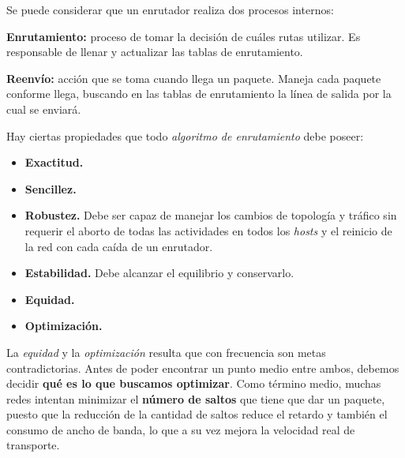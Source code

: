 \documentclass[10pt,a4paper]{article}
\begin{document}
Se puede considerar que un enrutador realiza dos procesos internos:
\begin{description}
\item \textbf{Enrutamiento:} proceso de tomar la decisión de cuáles rutas utilizar. Es responsable de llenar y actualizar las tablas de enrutamiento. 
\item \textbf{Reenvío:} acción que se toma cuando llega un paquete. Maneja cada paquete conforme llega, buscando en las tablas de enrutamiento la línea de salida por la cual se enviará.
\end{description}

Hay ciertas propiedades que todo \textit{algoritmo de enrutamiento} debe poseer:

\begin{multicols}{2}
\begin{itemize}
\item \textbf{Exactitud.}
\item \textbf{Sencillez.}
\item \textbf{Robustez.} Debe ser capaz de manejar los cambios de topología y tráfico sin requerir el aborto de todas las actividades en todos los \textit{hosts} y el reinicio de la red con cada caída de un enrutador.
\columnbreak
\item \textbf{Estabilidad.} Debe alcanzar el equilibrio y conservarlo.
\item \textbf{Equidad.}
\item \textbf{Optimización.}
\end{itemize}
\end{multicols}

La \textit{equidad} y la \textit{optimización} resulta que con frecuencia son metas contradictorias. Antes de poder encontrar un punto medio entre ambos, debemos decidir \textbf{qué es lo que buscamos optimizar}. Como término medio, muchas redes intentan minimizar el \textbf{número de saltos} que tiene que dar un paquete, puesto que la reducción de la cantidad de saltos reduce el retardo y también el consumo de ancho de banda, lo que a su vez mejora la velocidad real de transporte.
\end{document}
